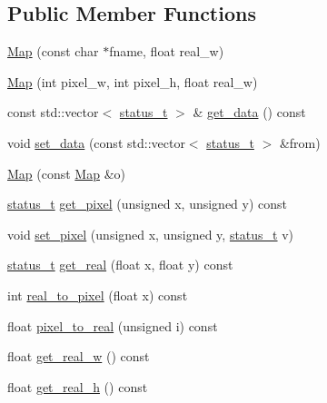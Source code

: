 \subsection*{Public Member Functions}
\begin{DoxyCompactItemize}
\item 
\hyperlink{classfastsim_1_1_map_ae32a687cd08d65d70eaece0fc8b13b69}{Map} (const char $\ast$fname, float real\+\_\+w)
\item 
\hyperlink{classfastsim_1_1_map_a5eba1cac3a23c50f5fe09a196a1e078a}{Map} (int pixel\+\_\+w, int pixel\+\_\+h, float real\+\_\+w)
\item 
const std\+::vector$<$ \hyperlink{classfastsim_1_1_map_ae0ff811304fed4a4ca33e4676534a9aa}{status\+\_\+t} $>$ \& \hyperlink{classfastsim_1_1_map_ad947b2260ffcacd36cdddb6ebbd9934e}{get\+\_\+data} () const 
\item 
void \hyperlink{classfastsim_1_1_map_a95389a55326a02065667cda14f7d45a1}{set\+\_\+data} (const std\+::vector$<$ \hyperlink{classfastsim_1_1_map_ae0ff811304fed4a4ca33e4676534a9aa}{status\+\_\+t} $>$ \&from)
\item 
\hyperlink{classfastsim_1_1_map_a0b47ac90a1d15f6b5181470d54aa0ac1}{Map} (const \hyperlink{classfastsim_1_1_map}{Map} \&o)
\item 
\hyperlink{classfastsim_1_1_map_ae0ff811304fed4a4ca33e4676534a9aa}{status\+\_\+t} \hyperlink{classfastsim_1_1_map_a80cb7f9db942484b576268d2207515aa}{get\+\_\+pixel} (unsigned x, unsigned y) const 
\item 
void \hyperlink{classfastsim_1_1_map_a8703b12079a60c5d1d07dbb041e00933}{set\+\_\+pixel} (unsigned x, unsigned y, \hyperlink{classfastsim_1_1_map_ae0ff811304fed4a4ca33e4676534a9aa}{status\+\_\+t} v)
\item 
\hyperlink{classfastsim_1_1_map_ae0ff811304fed4a4ca33e4676534a9aa}{status\+\_\+t} \hyperlink{classfastsim_1_1_map_ac31bab0a5ac649c39274f652eeb9621f}{get\+\_\+real} (float x, float y) const 
\item 
int \hyperlink{classfastsim_1_1_map_ad064e306d602f09666be0b8af8401652}{real\+\_\+to\+\_\+pixel} (float x) const 
\item 
float \hyperlink{classfastsim_1_1_map_a06129e8c8f1ff2a38692f8b22ef9112d}{pixel\+\_\+to\+\_\+real} (unsigned i) const 
\item 
float \hyperlink{classfastsim_1_1_map_a5d2dafd76cbba475c7d35f156cfcf05a}{get\+\_\+real\+\_\+w} () const 
\item 
float \hyperlink{classfastsim_1_1_map_a9288c83d80cb2944775b34ce2664bf80}{get\+\_\+real\+\_\+h} () const 

\end{DoxyCompactItemize}
